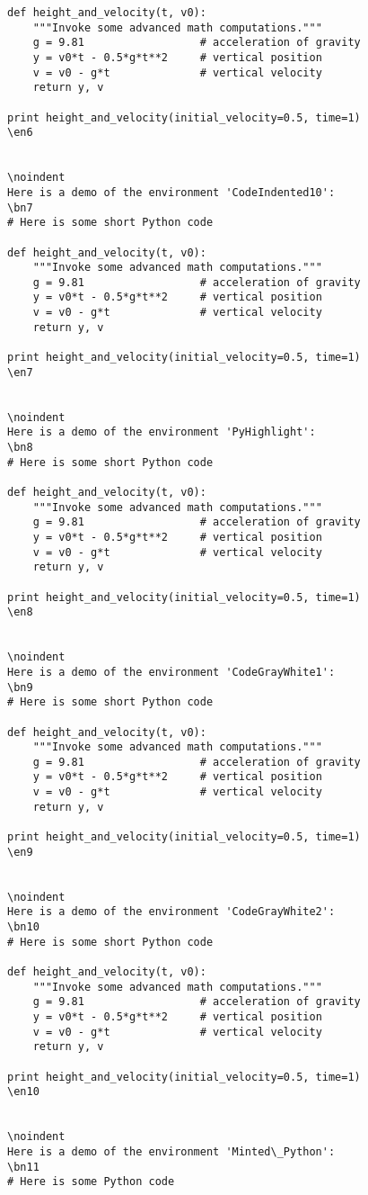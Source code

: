 \documentclass[a4paper,11pt]{article}
\begin{document}
{{{{{{{{{{{\begin{Verbatim}
def height_and_velocity(t, v0):
    """Invoke some advanced math computations."""
    g = 9.81                  # acceleration of gravity
    y = v0*t - 0.5*g*t**2     # vertical position
    v = v0 - g*t              # vertical velocity
    return y, v

print height_and_velocity(initial_velocity=0.5, time=1)
\en6


\noindent
Here is a demo of the environment 'CodeIndented10':
\bn7
# Here is some short Python code

def height_and_velocity(t, v0):
    """Invoke some advanced math computations."""
    g = 9.81                  # acceleration of gravity
    y = v0*t - 0.5*g*t**2     # vertical position
    v = v0 - g*t              # vertical velocity
    return y, v

print height_and_velocity(initial_velocity=0.5, time=1)
\en7


\noindent
Here is a demo of the environment 'PyHighlight':
\bn8
# Here is some short Python code

def height_and_velocity(t, v0):
    """Invoke some advanced math computations."""
    g = 9.81                  # acceleration of gravity
    y = v0*t - 0.5*g*t**2     # vertical position
    v = v0 - g*t              # vertical velocity
    return y, v

print height_and_velocity(initial_velocity=0.5, time=1)
\en8


\noindent
Here is a demo of the environment 'CodeGrayWhite1':
\bn9
# Here is some short Python code

def height_and_velocity(t, v0):
    """Invoke some advanced math computations."""
    g = 9.81                  # acceleration of gravity
    y = v0*t - 0.5*g*t**2     # vertical position
    v = v0 - g*t              # vertical velocity
    return y, v

print height_and_velocity(initial_velocity=0.5, time=1)
\en9


\noindent
Here is a demo of the environment 'CodeGrayWhite2':
\bn10
# Here is some short Python code

def height_and_velocity(t, v0):
    """Invoke some advanced math computations."""
    g = 9.81                  # acceleration of gravity
    y = v0*t - 0.5*g*t**2     # vertical position
    v = v0 - g*t              # vertical velocity
    return y, v

print height_and_velocity(initial_velocity=0.5, time=1)
\en10


\noindent
Here is a demo of the environment 'Minted\_Python':
\bn11
# Here is some Python code


\end{Verbatim}}}}}}}}}}}}
\end{document}
